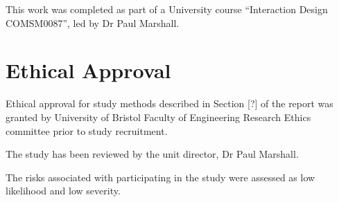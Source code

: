 \documentclass[manuscript,screen,review]{acmart}
\begin{document}
This work was completed as part of a University course “Interaction Design COMSM0087”, led by Dr Paul Marshall.


\section{Ethical Approval} 


Ethical approval for study methods described in Section [?] of the report was granted by University of Bristol Faculty of Engineering Research Ethics committee prior to study recruitment.

The study has been reviewed by the unit director, Dr Paul Marshall.

The risks associated with participating in the study were assessed as low likelihood and low severity. 
\end{document}
